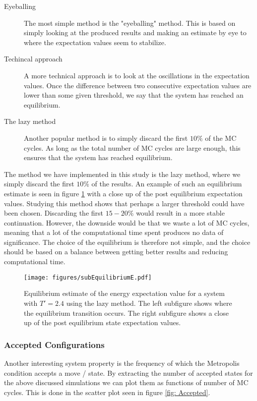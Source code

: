 \documentclass[a4paper, 10pt, reqno]{amsart}
\begin{document}
\begin{description}
    \item [Eyeballing]The most simple method is the "eyeballing" method. This is based on simply looking at the produced results and making an estimate by eye to where the expectation values seem to stabilize.
    
    \item[Techincal approach] A more technical approach is to look at the oscillations in the expectation values. Once the difference between two consecutive expectation values are lower than some given threshold, we say that the system has reached an equilibrium.
    
    \item[The lazy method] Another popular method is to simply discard the first $10\%$ of the MC cycles. As long as the total number of MC cycles are large enough, this ensures that the system has reached equilibrium. 
\end{description}
The method we have implemented in this study is the lazy method, where we simply discard the first $10\%$ of the results. An example of such an equilibrium estimate is seen in figure \ref{fig: Equilibrium} with a close up of the post equilibrium expectation values. Studying this method shows that perhaps a larger threshold could have been chosen. Discarding the first $15-20\%$ would result in a more stable continuation. However, the downside would be that we waste a lot of MC cycles, meaning that a lot of the computational time spent produces no data of significance. The choice of the equilibrium is therefore not simple, and the choice should be based on a balance between getting better results and reducing computational time.

\begin{figure}
    \centering
    \texttt{[image: figures/subEquilibriumE.pdf]}
    \caption{Equilibrium estimate of the energy expectation value for a system with $T' = 2.4$ using the lazy method. The left subfigure shows where the equilibrium transition occurs. The right subfigure shows a close up of the post equilibrium state expectation values.}
    \label{fig: Equilibrium}
\end{figure}

\subsubsection{Accepted Configurations} Another interesting system property is the frequency of which the Metropolis condition accepts a move / state. By extracting the number of accepted states for the above discussed simulations we can plot them as functions of number of MC cycles. This is done in the scatter plot seen in figure \ref{fig: Accepted}.
\end{document}
